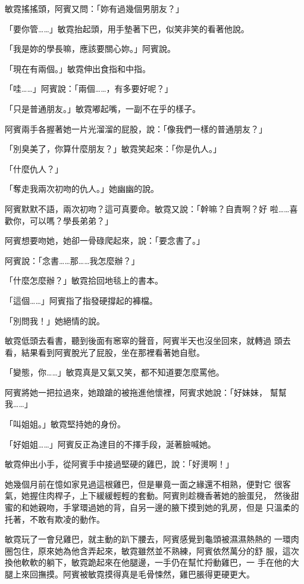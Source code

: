 敏霓搖搖頭，阿賓又問：「妳有過幾個男朋友？」

「要你管……」敏霓抬起頭，用手墊著下巴，似笑非笑的看著他說。

「我是妳的學長嘛，應該要關心妳。」阿賓說。

「現在有兩個。」敏霓伸出食指和中指。

「哇……」阿賓說：「兩個……，有多要好呢？」

「只是普通朋友。」敏霓嘟起嘴，一副不在乎的樣子。

阿賓兩手各握著她一片光溜溜的屁股，說：「像我們一樣的普通朋友？」

「別臭美了，你算什麼朋友？」敏霓笑起來：「你是仇人。」

「什麼仇人？」

「奪走我兩次初吻的仇人。」她幽幽的說。

阿賓默默不語，兩次初吻？這可真要命。敏霓又說：「幹嘛？自責啊？好
啦……喜歡你，可以嗎？學長弟弟？」

阿賓想要吻她，她卻一骨碌爬起來，說：「要念書了。」

阿賓說：「念書……那……我怎麼辦？」

「什麼怎麼辦？」敏霓拾回地毯上的書本。

「這個……」阿賓指了指發硬撐起的褲檔。

「別問我！」她絕情的說。

敏霓低頭去看書，聽到後面有窸窣的聲音，阿賓半天也沒坐回來，就轉過
頭去看，結果看到阿賓脫光了屁股，坐在那裡看著她自慰。

「變態，你……」敏霓真是又氣又笑，都不知道要怎麼罵他。

阿賓將她一把拉過來，她踉蹌的被拖進他懷裡，阿賓求她說：「好妹妹，
幫幫我……」

「叫姐姐。」敏霓堅持她的身份。

「好姐姐……」阿賓反正為達目的不擇手段，涎著臉喊她。

敏霓伸出小手，從阿賓手中接過堅硬的雞巴，說：「好燙啊！」

她幾個月前在憶如家見過這根雞巴，但是畢竟一面之緣還不相熟，便對它
很客氣，她握住肉桿子，上下緩緩輕輕的套動。阿賓則趁機香著她的臉蛋兒，
然後甜蜜的和她親吻，手掌環過她的背，自另一邊的腋下摸到她的乳房，但是
只溫柔的托著，不敢有欺凌的動作。

敏霓玩了一會兒雞巴，就主動的趴下腰去，阿賓感覺到龜頭被濕濕熱熱的
一環肉圈包住，原來她為他含弄起來，敏霓雖然並不熟練，阿賓依然萬分的舒
服，這次換他軟軟的躺下，敏霓跪起來在他腿邊，一手仍在幫忙捋動雞巴，一
手在他的大腿上來回撫摸。阿賓被敏霓摸得真是毛骨悚然，雞巴脹得更硬更大。

